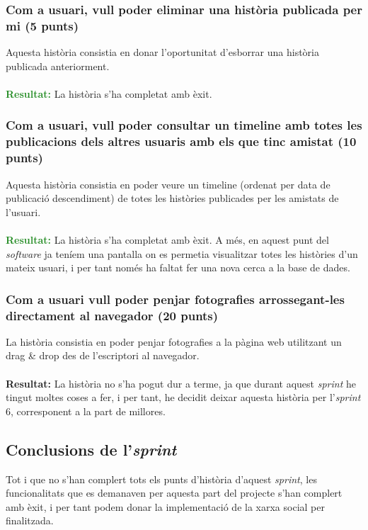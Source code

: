 \documentclass[11pt,catalan,listoffigures,listoftables]{tfgetsinf}
\begin{document}
\subsubsection{Com a usuari, vull poder eliminar una història publicada per mi (5 punts)}

Aquesta història consistia en donar l'oportunitat d'esborrar una història publicada anteriorment.\\ \\
\textcolor{forestgreen}{\textbf{Resultat:}} La història s'ha completat amb èxit.

\subsubsection{Com a usuari, vull poder consultar un timeline amb totes les publicacions dels altres usuaris amb els que tinc amistat (10 punts)}

Aquesta història consistia en poder veure un timeline (ordenat per data de publicació descendiment) de totes les històries publicades per les amistats de l'usuari.\\ \\
\textcolor{forestgreen}{\textbf{Resultat:}} La història s'ha completat amb èxit. A més, en aquest punt del \textit{software} ja teníem una pantalla on es permetia visualitzar totes les històries d'un mateix usuari, i per tant només ha faltat fer una nova cerca a la base de dades.

\subsubsection{Com a usuari vull poder penjar fotografies arrossegant-les directament al navegador (20 punts)}

La història consistia en poder penjar fotografies a la pàgina web utilitzant un drag \& drop des de l'escriptori al navegador.\\ \\
\textcolor{costumyellow}{\textbf{Resultat:}} La història no s'ha pogut dur a terme, ja que durant aquest \textit{sprint} he tingut moltes coses a fer, i per tant, he decidit deixar aquesta història per l'\textit{sprint} 6, corresponent a la part de millores.

\subsection{Conclusions de l'\textit{sprint}}

Tot i que no s'han complert tots els punts d'història d'aquest \textit{sprint}, les funcionalitats que es demanaven per aquesta part del projecte s'han complert amb èxit, i per tant podem donar la implementació de la xarxa social per finalitzada.
\end{document}
